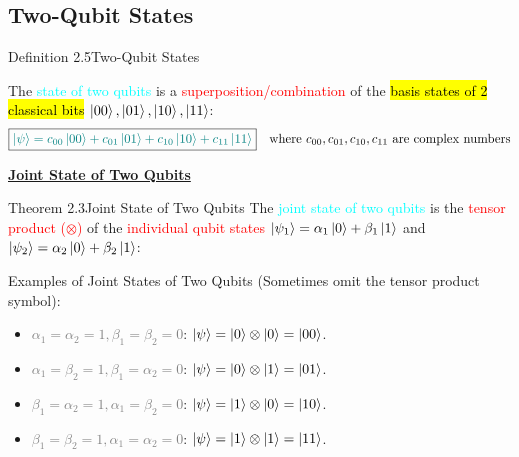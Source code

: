 \documentclass{book}
\begin{document}
\subsection{Two-Qubit States}
\begin{defBox}{Definition 2.5}{Two-Qubit States}
    \raggedright
    The \textcolor{cyan}{state of two qubits} is a \textcolor{red}{superposition/combination} of the \hl{basis states of 2 classical bits} \textcolor{red}{ \(\ket{00}, \ket{01}, \ket{10}, \ket{11}\)}:
    \[
    \boxed{\textcolor{teal}{\ket{\psi} = c_{00} \ket{00} + c_{01} \ket{01} + c_{10} \ket{10} + c_{11} \ket{11}}} \quad \text{where } c_{00}, c_{01}, c_{10}, c_{11} \text{ are complex numbers}
    \]
\end{defBox}
\uline{\textbf{Joint State of Two Qubits}}
\begin{thmBox}{Theorem 2.3}{Joint State of Two Qubits}
    The \textcolor{cyan}{joint state of two qubits} is the \textcolor{red}{tensor product ($\otimes$)} of the \textcolor{red}{individual qubit states} \textcolor{brown}{\(\ket{\psi_1} = \alpha_1 \ket{0} + \beta_1 \ket{1}\)} and \textcolor{brown}{\(\ket{\psi_2} = \alpha_2 \ket{0} + \beta_2 \ket{1}\)}:
    \begin{center}
    \end{center}
\end{thmBox}
\newpage
Examples of Joint States of Two Qubits (Sometimes omit the tensor product symbol):
\begin{itemize}
    \item \textcolor{gray}{\(\alpha_1 = \alpha_2 = 1, \beta_1 = \beta_2 = 0\)}: \textcolor{forestgreen}{\(\ket{\psi} = \ket{0} \otimes \ket{0} = \ket{00}\)}.
    \item \textcolor{gray}{\(\alpha_1 = \beta_2 = 1, \beta_1 = \alpha_2 = 0\)}: \textcolor{forestgreen}{\(\ket{\psi} = \ket{0} \otimes \ket{1} = \ket{01}\)}.
    \item \textcolor{gray}{\(\beta_1 = \alpha_2 = 1, \alpha_1 = \beta_2 = 0\)}: \textcolor{forestgreen}{\(\ket{\psi} = \ket{1} \otimes \ket{0} = \ket{10}\)}.
    \item \textcolor{gray}{\(\beta_1 = \beta_2 = 1, \alpha_1 = \alpha_2 = 0\)}: \textcolor{forestgreen}{\(\ket{\psi} = \ket{1} \otimes \ket{1} = \ket{11}\)}.
\end{itemize}
\end{document}
